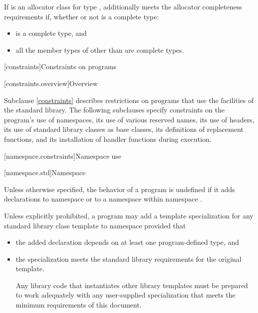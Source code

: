 \pnum
If  is an allocator class for type ,
 additionally meets the allocator completeness requirements if,
whether or not  is a complete type:
\begin{itemize}
\item {} is a complete type, and
\item all the member types of 
  other than  are complete types.
\end{itemize}

[constraints]{Constraints on programs}

[constraints.overview]{Overview}

\pnum
Subclause \ref{constraints} describes restrictions on \Cpp{} programs that use the facilities of
the \Cpp{} standard library. The following subclauses specify constraints on the
program's use of namespaces, its use of various reserved
names, its use of headers, its use of
standard library classes as base classes, its
definitions of replacement functions, and its
installation of handler functions during execution.

[namespace.constraints]{Namespace use}

[namespace.std]{Namespace }

\pnum
Unless otherwise specified,
the behavior of a \Cpp{} program is undefined if it adds declarations to namespace
or to a namespace within namespace
.

\pnum
Unless explicitly prohibited,
a program may add a template specialization for
any standard library class template
to namespace
 provided that
\begin{itemize}
\item the added declaration
depends on at least one program-defined type, and

\item the specialization meets the standard library requirements
for the original template.
\begin{footnote}
Any
library code that instantiates other library templates
must be prepared to work adequately with any user-supplied specialization
that meets the minimum requirements of this document.
\end{footnote}
\end{itemize}

